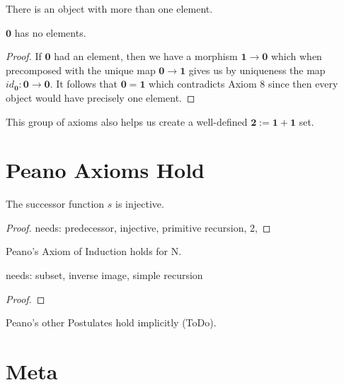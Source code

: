 \begin{axiom}
There is an object with more than one element.
\end{axiom}

\begin{lemma}
$\mathbf{0}$ has no elements.
\end{lemma}

\begin{proof}
If $\mathbf{0}$ had an element, then we have a morphism $\mathbf{1} \longrightarrow \mathbf{0}$ which when precomposed with the unique map $\mathbf{0} \longrightarrow \mathbf{1}$  gives us by uniqueness the map $id_\mathbf{0}:\mathbf{0} \longrightarrow \mathbf{0}$. It follows that $\mathbf{0} = \mathbf{1}$ which contradicts Axiom 8 since then every object would have precisely one element.
\end{proof}

\begin{remark}
This group of axioms also helps us create a well-defined $\mathbf{2} := \mathbf{1}+\mathbf{1}$ set.
\end{remark}


\section{Peano Axioms Hold}

\begin{theorem}
The successor function $s$ is injective.
\end{theorem}

\begin{proof}
needs: predecessor, injective, primitive recursion, 2, 
\end{proof}

\begin{theorem}
Peano's Axiom of Induction holds for N.
\end{theorem}
needs: subset, inverse image, simple recursion
\begin{proof}

\end{proof}

\begin{remark}
Peano's other Postulates hold implicitly (ToDo).
\end{remark}

\section{Meta}

